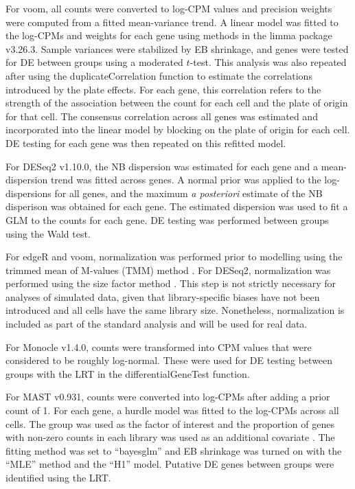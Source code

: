 \documentclass{article}
\begin{document}
For voom, all counts were converted to log-CPM values and precision weights were computed from a fitted mean-variance trend.
A linear model was fitted to the log-CPMs and weights for each gene using methods in the limma package v3.26.3.
Sample variances were stabilized by EB shrinkage, and genes were tested for DE between groups using a moderated $t$-test.
This analysis was also repeated after using the duplicateCorrelation function to estimate the correlations introduced by the plate effects.
For each gene, this correlation refers to the strength of the association between the count for each cell and the plate of origin for that cell.
The consensus correlation across all genes was estimated and incorporated into the linear model by blocking on the plate of origin for each cell.
DE testing for each gene was then repeated on this refitted model.

For DESeq2 v1.10.0, the NB dispersion was estimated for each gene and a mean-dispersion trend was fitted across genes.
A normal prior was applied to the log-dispersions for all genes, and the maximum \textit{a posteriori} estimate of the NB disperison was obtained for each gene.
The estimated dispersion was used to fit a GLM to the counts for each gene.
DE testing was performed between groups using the Wald test.

For edgeR and voom, normalization was performed prior to modelling using the trimmed mean of M-values (TMM) method \citep{robinson2010scaling}.
For DESeq2, normalization was performed using the size factor method \citep{anders2010differential}.
This step is not strictly necessary for analyses of simulated data, given that library-specific biases have not been introduced and all cells have the same library size.
Nonetheless, normalization is included as part of the standard analysis and will be used for real data.

For Monocle v1.4.0, counts were transformed into CPM values that were considered to be roughly log-normal.
These were used for DE testing between groups with the LRT in the differentialGeneTest function.

For MAST v0.931, counts were converted into log-CPMs after adding a prior count of 1.
For each gene, a hurdle model was fitted to the log-CPMs across all cells. 
The group was used as the factor of interest and the proportion of genes with non-zero counts in each library was used as an additional covariate \citep{finak2015mast}.
The fitting method was set to ``bayesglm'' and EB shrinkage was turned on with the ``MLE'' method and the ``H1'' model.
Putative DE genes between groups were identified using the LRT.
\end{document}
